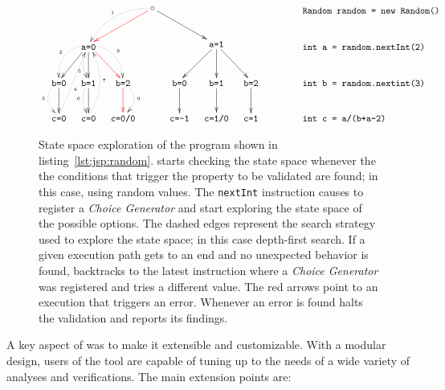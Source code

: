 \begin{figure}[t]
\centering
\[\xymatrix@C=1em{
	& & & \ar@[red][lld] \ar@/_1pc/@{.>}[lld]_{\txt{\tiny 1}} \circ \ar[rrd] & & & & \txt{\texttt{~~~~~~Random random = new Random()}} \\
	& \ar[ld] \ar@/_1pc/@{.>}[ld]_{\txt{\tiny 2}} \ar[d] \ar@/_/@{.>}[d]_(0.7){\txt{\tiny 5}} \txt{\texttt{a=0}} \ar@[red][rd] \ar@/^1pc/@{.>}[rd]^{\txt{\tiny 8}} & & & & 
	  \ar[ld] \ar[d] \texttt{a=1} \ar[rd] & & \txt{\texttt{~~~int a = random.nextInt(2)}} \\
	\ar[d] \ar@/_1pc/@{.>}[d]_{\txt{\tiny 3}} \txt{\texttt{b=0}} & 
	\ar[d] \ar@/_/@{.>}[d]_{\txt{\tiny 6}} \txt{\texttt{b=1}} & 
	\ar@[red][d] \ar@/^1pc/@{.>}[d]^{\txt{\tiny 9}} \txt{\texttt{b=2}} & & 
	\ar[d] \txt{\texttt{b=0}} & 
	\ar[d] \txt{\texttt{b=1}} & 
	\ar[d] \txt{\texttt{b=2}} & \txt{\texttt{~~~int b = random.nextint(3)}} \\
	\txt{\texttt{c=0}} \ar@{.>}[ruu]_(0.4){\txt{\tiny 4}} & 
	\ar@/_1pc/@{.>}[uu]_{\txt{\tiny 7}} \txt{\texttt{c=0}} & 
	\txt{\texttt{c=0/0}} & & 
	\txt{\texttt{c=-1}} & 
	\txt{\texttt{c=1/0}} & 
	\txt{\texttt{c=1}} & 
	\txt{\texttt{int c = a/(b+a-2)~~~~~~}}
} \]
\caption[State space exploration of an example program]{State space exploration of the program shown in listing~\ref{lst:jsp:random}. \jpf starts checking the state space whenever the the conditions that trigger the property to be validated are found; in this case, using random values. The \texttt{nextInt} instruction causes \jpf to register a \textit{Choice Generator} and start exploring the state space of the possible options. The dashed edges represent the search strategy used to explore the state space; in this case depth-first search. If a given execution path gets to an end and no unexpected behavior is found, \jpf backtracks to the latest instruction where a \textit{Choice Generator} was registered and tries a different value. The red arrows point to an execution that triggers an error. Whenever an error is found \jpf halts the validation and reports its findings.}
\label{fig:jpf:random}
\end{figure}

A key aspect of \jpf was to make it extensible and customizable. With a modular design, users of the tool are capable of tuning \jpf up to the needs of a wide variety of analyses and verifications. The main extension points are:

